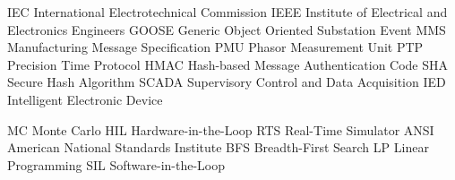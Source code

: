   {IEC}   {International Electrotechnical Commission}
  {IEEE}  {Institute of Electrical and Electronics Engineers}
 {GOOSE} {Generic Object Oriented Substation Event}
   {MMS}   {Manufacturing Message Specification}
   {PMU}   {Phasor Measurement Unit}
   {PTP}   {Precision Time Protocol}
  {HMAC}  {Hash-based Message Authentication Code}
   {SHA}   {Secure Hash Algorithm}
 {SCADA} {Supervisory Control and Data Acquisition}
   {IED}   {Intelligent Electronic Device}

    {MC}    {Monte Carlo}
   {HIL}   {Hardware-in-the-Loop}
   {RTS}   {Real-Time Simulator}
  {ANSI}  {American National Standards Institute}
   {BFS}   {Breadth-First Search}
    {LP}    {Linear Programming}
   {SIL}   {Software-in-the-Loop}
